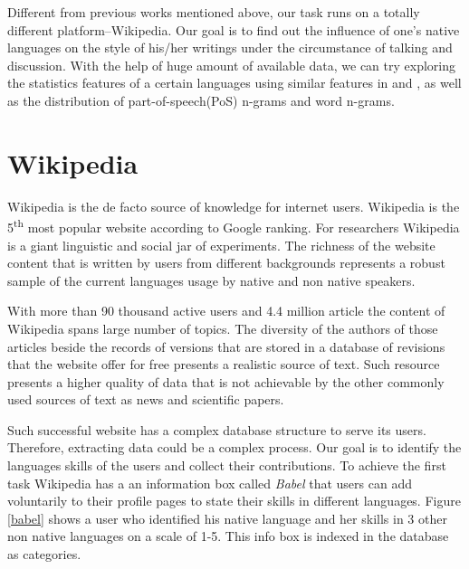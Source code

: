 \documentclass[11pt]{article}
\begin{document}
Different from previous works mentioned above, our task runs on a totally different platform--Wikipedia. Our goal is to find out the influence of one's native languages on the style of his/her writings under the circumstance of talking and discussion. With the help of huge amount of available data, we can try exploring the statistics features of a certain languages using similar features in  and , as well as the distribution of part-of-speech(PoS) n-grams and word n-grams.      

\section{Wikipedia}

Wikipedia is the de facto source of knowledge for internet users. Wikipedia is the 5\textsuperscript{th} most popular website according to Google ranking. For researchers Wikipedia is a giant linguistic and social jar of experiments. The richness of the website content that is written by users from different backgrounds represents a robust sample of the current languages usage by native and non native speakers.

With more than 90 thousand active users and 4.4 million article the content of Wikipedia spans large number of topics. The diversity of the authors of those articles beside the records of versions that are stored in a database of revisions that the website offer for free presents a realistic source of text. Such resource presents a higher quality of data that is not achievable by the other commonly used sources of text as news and scientific papers.

Such successful website has a complex database structure to serve its users. Therefore, extracting data could be a complex process. Our goal is to identify the languages skills of the users and collect their contributions. To achieve the first task Wikipedia has a an information box called \emph{Babel} that users can add voluntarily to their profile pages to state their skills in different languages. Figure \ref{babel} shows a user who identified his native language and her skills in 3 other non native languages on a scale of 1-5. This info box is indexed in the database as categories.
\end{document}
